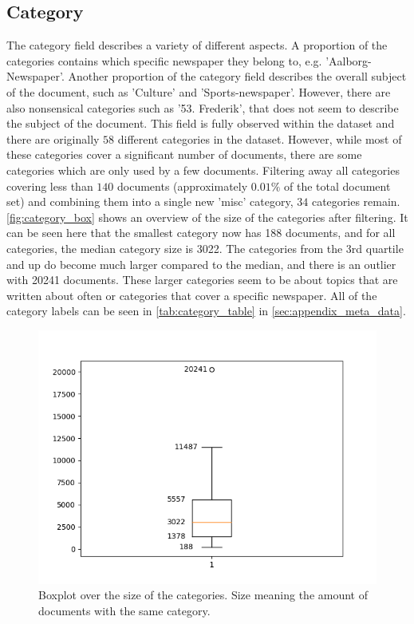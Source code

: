 \subsection{Category}
The category field describes a variety of different aspects.
A proportion of the categories contains which specific newspaper they belong to, e.g. 'Aalborg-Newspaper'.
Another proportion of the category field describes the overall subject of the document, such as 'Culture' and 'Sports-newspaper'.
However, there are also nonsensical categories such as '53. Frederik', that does not seem to describe the subject of the document.
This field is fully observed within the dataset and there are originally $58$ different categories in the dataset.
However, while most of these categories cover a significant number of documents, there are some categories which are only used by a few documents.
Filtering away all categories covering less than $140$ documents (approximately $0.01\%$ of the total document set) and combining them into a single new 'misc' category, $34$ categories remain.
\autoref{fig:category_box} shows an overview of the size of the categories after filtering.
It can be seen here that the smallest category now has 188 documents, and for all categories, the median category size is 3022.
The categories from the 3rd quartile and up do become much larger compared to the median, and there is an outlier with 20241 documents.
These larger categories seem to be about topics that are written about often or categories that cover a specific newspaper.
All of the category labels can be seen in \autoref{tab:category_table} in \autoref{sec:appendix_meta_data}.

\begin{figure}
	\centering
	\includegraphics[width=1 \linewidth]{figures/category_box.png}
	\caption{Boxplot over the size of the categories. Size meaning the amount of documents with the same category.}
	\label{fig:category_box}
\end{figure}

